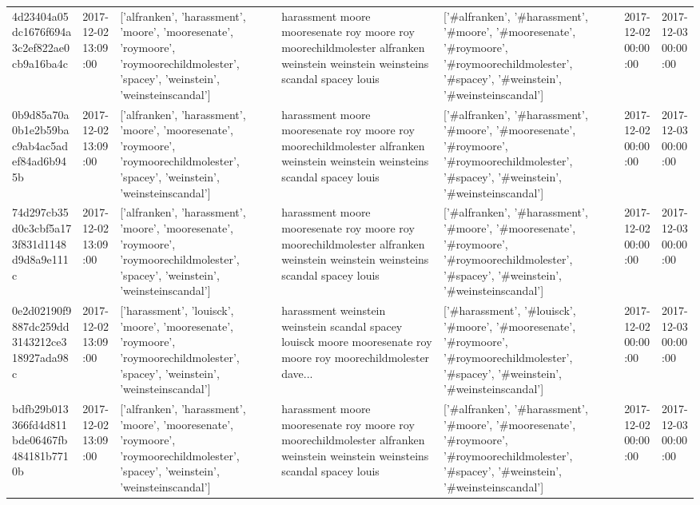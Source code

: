 \begin{tabular}{lllllll}
4d23404a05dc1676f694a3c2ef822ae0cb9a16ba4c & 2017-12-02 13:09:00 & ['alfranken', 'harassment', 'moore', 'mooresenate', 'roymoore', 'roymoorechildmolester', 'spacey', 'weinstein', 'weinsteinscandal'] & harassment moore mooresenate roy moore roy moorechildmolester alfranken weinstein weinstein weinsteins scandal spacey louis & ['#alfranken', '#harassment', '#moore', '#mooresenate', '#roymoore', '#roymoorechildmolester', '#spacey', '#weinstein', '#weinsteinscandal'] & 2017-12-02 00:00:00 & 2017-12-03 00:00:00 \\
0b9d85a70a0b1e2b59bac9ab4ac5adef84ad6b945b & 2017-12-02 13:09:00 & ['alfranken', 'harassment', 'moore', 'mooresenate', 'roymoore', 'roymoorechildmolester', 'spacey', 'weinstein', 'weinsteinscandal'] & harassment moore mooresenate roy moore roy moorechildmolester alfranken weinstein weinstein weinsteins scandal spacey louis & ['#alfranken', '#harassment', '#moore', '#mooresenate', '#roymoore', '#roymoorechildmolester', '#spacey', '#weinstein', '#weinsteinscandal'] & 2017-12-02 00:00:00 & 2017-12-03 00:00:00 \\
74d297cb35d0c3cbf5a173f831d1148d9d8a9e111c & 2017-12-02 13:09:00 & ['alfranken', 'harassment', 'moore', 'mooresenate', 'roymoore', 'roymoorechildmolester', 'spacey', 'weinstein', 'weinsteinscandal'] & harassment moore mooresenate roy moore roy moorechildmolester alfranken weinstein weinstein weinsteins scandal spacey louis & ['#alfranken', '#harassment', '#moore', '#mooresenate', '#roymoore', '#roymoorechildmolester', '#spacey', '#weinstein', '#weinsteinscandal'] & 2017-12-02 00:00:00 & 2017-12-03 00:00:00 \\
0e2d02190f9887dc259dd3143212ce318927ada98c & 2017-12-02 13:09:00 & ['harassment', 'louisck', 'moore', 'mooresenate', 'roymoore', 'roymoorechildmolester', 'spacey', 'weinstein', 'weinsteinscandal'] & harassment weinstein weinstein scandal spacey louisck moore mooresenate roy moore roy moorechildmolester dave... & ['#harassment', '#louisck', '#moore', '#mooresenate', '#roymoore', '#roymoorechildmolester', '#spacey', '#weinstein', '#weinsteinscandal'] & 2017-12-02 00:00:00 & 2017-12-03 00:00:00 \\
bdfb29b013366fd4d811bde06467fb484181b7710b & 2017-12-02 13:09:00 & ['alfranken', 'harassment', 'moore', 'mooresenate', 'roymoore', 'roymoorechildmolester', 'spacey', 'weinstein', 'weinsteinscandal'] & harassment moore mooresenate roy moore roy moorechildmolester alfranken weinstein weinstein weinsteins scandal spacey louis & ['#alfranken', '#harassment', '#moore', '#mooresenate', '#roymoore', '#roymoorechildmolester', '#spacey', '#weinstein', '#weinsteinscandal'] & 2017-12-02 00:00:00 & 2017-12-03 00:00:00 \\

\end{tabular}
